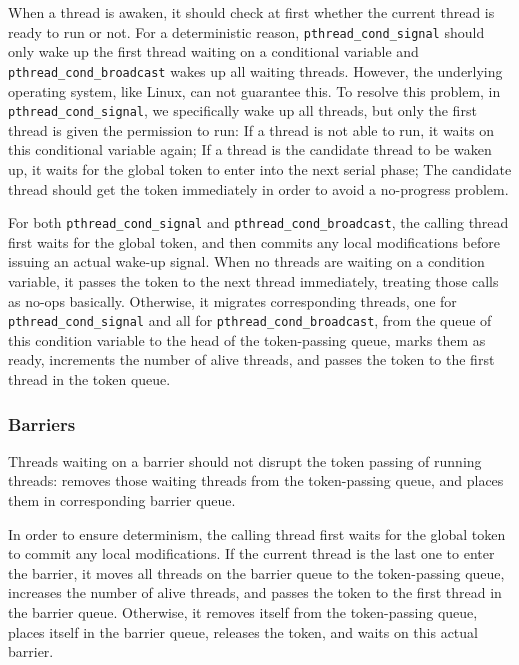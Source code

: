When a thread is awaken, it should check at first whether the current thread is ready to run or not. For a deterministic reason, \texttt{pthread\_cond\_signal} should only wake up the first thread waiting on a conditional variable and \texttt{pthread\_cond\_broadcast} wakes up all waiting threads. However, the underlying operating system, like Linux, can not guarantee this. To resolve this problem, in \texttt{pthread\_cond\_signal}, we specifically wake up all threads, but only the first thread is given the permission to run: If a thread is not able to run, it waits on this conditional variable again; If a thread is the candidate thread to be waken up, it waits for the global token to enter into the next serial phase; The candidate thread should get the token immediately in order to avoid a no-progress problem. 

For both \texttt{pthread\_cond\_signal} and \texttt{pthread\_cond\_broadcast}, the calling thread first waits for the global token, and then commits any local modifications before issuing an actual wake-up signal. When no threads are waiting on a condition variable, it passes the token to the next thread immediately, treating those calls as no-ops basically. Otherwise, it migrates corresponding threads, one for \texttt{pthread\_cond\_signal} and all for \texttt{pthread\_cond\_broadcast}, from the queue of this condition variable to the head of the token-passing queue, marks them as ready, increments the number of alive threads, and passes the token to the first thread in the token queue. 

\subsubsection{Barriers}

\label{sec:barrierwait}

Threads waiting on a barrier should not disrupt the token passing of running threads: \dthreads{} removes those waiting threads from the token-passing queue, and places them in corresponding barrier queue.

In order to ensure determinism, the calling thread first waits for the global token to commit any local modifications. If the current thread is the last one to enter the barrier, it moves all threads on the barrier queue to the token-passing queue, increases the number of alive threads, and passes the token to the first thread in the barrier queue. Otherwise, it removes itself from the token-passing queue, places itself in the barrier queue, releases the token, and waits on this actual barrier.



